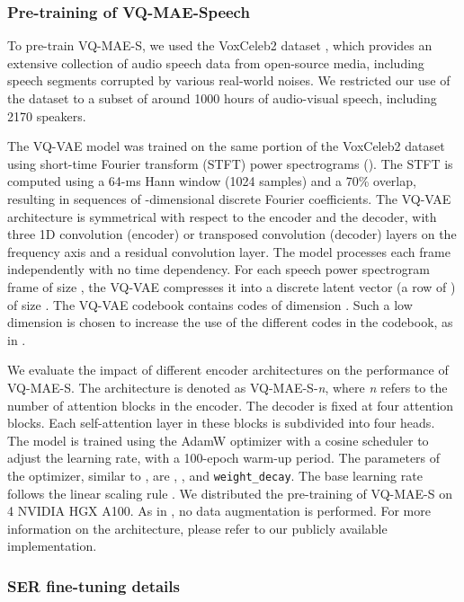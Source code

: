 \documentclass{article}
\begin{document}
\subsubsection{Pre-training of VQ-MAE-Speech}
\label{sec:pretrain_setting}
To pre-train VQ-MAE-S, we used the VoxCeleb2 dataset \cite{chung2018voxceleb2}, which provides an extensive collection of audio speech data from open-source media, including speech segments corrupted by various real-world noises. We restricted our use of the dataset to a subset of around 1000 hours of audio-visual speech, including 2170 speakers.

The VQ-VAE model was trained on the same portion of the VoxCeleb2 dataset using short-time Fourier transform (STFT) power spectrograms (). The STFT is computed using a 64-ms Hann window (1024 samples) and a 70\% overlap, resulting in sequences of -dimensional discrete Fourier coefficients. The VQ-VAE architecture is symmetrical with respect to the encoder and the decoder, with three 1D convolution (encoder) or transposed convolution (decoder) layers on the frequency axis and a residual convolution layer. The model processes each frame independently with no time dependency. For each speech power spectrogram frame of size , the VQ-VAE compresses it into a discrete latent vector (a row of ) of size . 
The VQ-VAE codebook contains  codes of dimension . Such a low dimension is chosen to increase the use of the different codes in the codebook, as in \cite{yuvector}. 


We evaluate the impact of different encoder architectures on the performance of VQ-MAE-S. The architecture is denoted as VQ-MAE-S-\emph{n}, where \emph{n} refers to the number of attention blocks in the encoder.  The decoder is fixed at four attention blocks. Each self-attention layer in these blocks is subdivided into four heads. The model is trained using the AdamW optimizer \cite{loshchilov2017decoupled} with a cosine scheduler to adjust the learning rate, with a 100-epoch warm-up period. The parameters of the optimizer, similar to \cite{he2022masked}, are , , and \texttt{weight\_decay}. The base learning rate follows the linear scaling rule \cite{goyal2017accurate} . We distributed the pre-training of VQ-MAE-S on 4 NVIDIA HGX A100. As in \cite{xu2022masked}, no data augmentation is performed. For more information on the architecture, please refer to our publicly available implementation.

\subsubsection{SER fine-tuning details}
\end{document}

